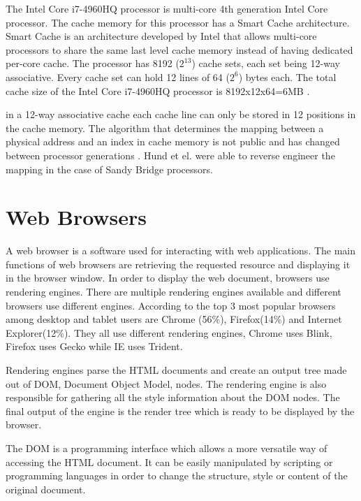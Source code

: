 \documentclass[10pt,a4paper,twoside]{book}
\begin{document}
The Intel Core i7-4960HQ processor is multi-core 4th generation Intel Core processor. The cache memory for this processor has a Smart Cache architecture. Smart Cache is an architecture developed by Intel that allows multi-core processors to share the same last level cache memory instead of having dedicated per-core cache. The processor has 8192 ($2^{13}$) cache sets, each set being 12-way associative. Every cache set can hold 12 lines of  64 ($2^6$) bytes each. The total cache size of the Intel Core i7-4960HQ processor is 8192x12x64=6MB \cite{oren2015spy}.

in a 12-way associative cache each cache line can only be stored in 12 positions in the cache memory. The algorithm that determines the mapping between a physical address and an index in cache memory is not public and has changed between processor generations \cite{oren2015spy}. Hund et el. \cite{hund2013practical} were able to reverse engineer the mapping in the case of Sandy Bridge processors.

\section{Web Browsers}

A web browser is a software used for interacting with web applications. The main functions of web browsers are retrieving the requested resource and displaying it in the browser window. In order to display the web document, browsers use rendering engines. There are multiple rendering engines available and different browsers use different engines. According to \cite{statcounter} the top 3 most popular browsers among desktop and tablet users are Chrome (56\%), Firefox(14\%) and Internet Explorer(12\%). They all use different rendering engines, Chrome uses Blink, Firefox uses Gecko while IE uses Trident\cite{howbrowserswork}.

Rendering engines parse the HTML documents and create an output tree made out of DOM, Document Object Model, nodes. The rendering engine is also responsible for gathering all the style information about the DOM nodes. The final output of the engine is the render tree which is ready to be displayed by the browser\cite{howbrowserswork}.

The DOM is a programming interface which allows a more versatile way of accessing the HTML document. It can be easily manipulated by scripting or programming languages in order to change the structure, style or content of the original document\cite{dom}.
\end{document}
